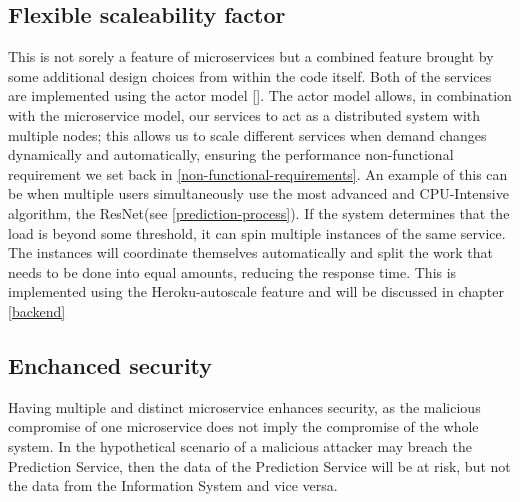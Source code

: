 		\subsection{Flexible scaleability factor}
			\label{flexible-scaleability-factor}
			This is not sorely a feature of microservices but a combined feature brought by some additional design choices 
			from within the code itself. Both of the services are implemented using the actor model [\cite{hewitt2015actor}]. 
			The actor model allows, in combination with the microservice model, our services to act as a distributed system with 
			multiple nodes; this allows us to scale different services when demand changes dynamically and automatically, ensuring 
			the performance non-functional requirement we set back in \ref{non-functional-requirements}. An example of this can be 
			when multiple users simultaneously use the most advanced and CPU-Intensive algorithm, the ResNet(see \ref{prediction-process}). 
			If the system determines that the load is beyond some threshold, it can spin multiple instances of the same service. 
			The instances will coordinate themselves automatically and split the work that needs to be done into equal amounts, 
			reducing the response time. This is implemented using the Heroku-autoscale feature and will be discussed in chapter \ref{backend}
		\subsection{Enchanced security}
			Having multiple and distinct microservice enhances security, as the malicious compromise of one microservice does not
			 imply the compromise of the whole system. In the hypothetical scenario of a malicious attacker may breach the 
			 Prediction Service, then the data of the Prediction Service will be at risk, but not the data from the Information 
			 System and vice versa.
